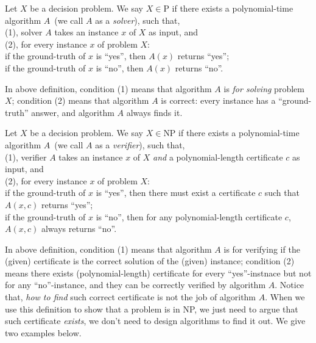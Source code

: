 
\begin{definition}[P]
Let $X$ be a decision problem. We say $X\in \textrm{P}$ if there exists a polynomial-time algorithm $A$~(we call $A$ as a \emph{solver}), such that,\\
	(1), solver $A$ takes an instance $x$ of $X$ as input, and \\
	(2), for every instance $x$ of problem $X$: \\
	\hspace*{0.2cm} if the ground-truth of $x$ is ``yes'', then $A(x)$ returns ``yes'';\\
	\hspace*{0.2cm} if the ground-truth of $x$ is ``no'', then $A(x)$ returns ``no''.
\end{definition}

In above definition, condition (1) means that algorithm $A$ is \emph{for solving} problem $X$;
condition (2) means that algorithm $A$ is correct: every instance has a ``ground-truth'' answer, and
algorithm $A$ always finds it.

\begin{definition}[NP]
Let $X$ be a decision problem. We say $X\in \textrm{NP}$ if there exists a polynomial-time algorithm $A$~(we call $A$ as a \emph{verifier}), such that,\\
	(1), verifier $A$ takes an instance $x$ of $X$ \emph{and} a polynomial-length certificate $c$ as input, and \\
	(2), for every instance $x$ of problem $X$: \\
	\hspace*{0.2cm} if the ground-truth of $x$ is ``yes'', then there must exist a certificate $c$ such that $A(x,c)$ returns ``yes'';\\
	\hspace*{0.2cm} if the ground-truth of $x$ is ``no'', then for any polynomial-length certificate $c$, $A(x,c)$ always returns ``no''.
\end{definition}

In above definition, condition (1) means that algorithm $A$ is for verifying if the (given) certificate is the correct solution of the (given) instance;
condition (2) means there exists (polynomial-length) certificate
for every ``yes''-instnace but not for any ``no''-instance, and they can be correctly verified by algorithm $A$.
Notice that, \emph{how to find} such correct certificate is not the job of algorithm $A$.
When we use this definition to show that a problem is in NP, we just need to argue that
such certificate \emph{exists}, we don't need to design algorithms to find it out.
We give two examples below.

